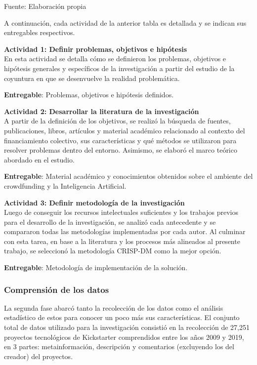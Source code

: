 \begin{flushleft}	%
	\small Fuente: Elaboración propia
\end{flushleft}

A continuación, cada actividad de la anterior tabla es detallada y se indican sus entregables respectivos.

\newpage
\textbf{Actividad 1: Definir problemas, objetivos e hipótesis}
\\
En esta actividad se detalla cómo se definieron los problemas, objetivos e hipótesis generales y específicos de la investigación a partir del estudio de la coyuntura en que se desenvuelve la realidad problemática.

\textbf{Entregable}: Problemas, objetivos e hipótesis definidos.


\textbf{Actividad 2: Desarrollar la literatura de la investigación}
\\
A partir de la definición de los objetivos, se realizó la búsqueda de fuentes, publicaciones, libros, artículos y material académico relacionado al contexto del financiamiento colectivo, sus características y qué métodos se utilizaron para resolver problemas dentro del entorno. Asimismo, se elaboró el marco teórico abordado en el estudio.

\textbf{Entregable}: Material académico y conocimientos obtenidos sobre el ambiente del crowdfunding y la Inteligencia Artificial.


\textbf{Actividad 3: Definir metodología de la investigación}
\\
Luego de conseguir los recursos intelectuales suficientes y los trabajos previos para el desarrollo de la investigación, se analizó cada antecedente y se compararon todas las metodologías implementadas por cada autor. Al culminar con esta tarea, en base a la literatura y los procesos más alineados al presente trabajo, se seleccionó la metodología CRISP-DM como la mejor opción.

\textbf{Entregable}: Metodología de implementación de la solución.


\subsubsection{Comprensión de los datos}
La segunda fase abarcó tanto la recolección de los datos como el análisis estadístico de estos para conocer un poco más sus características. El conjunto total de datos utilizado para la investigación consistió en la recolección de 27,251 proyectos tecnológicos de Kickstarter comprendidos entre los años 2009 y 2019, en 3 partes: metainformación, descripción y comentarios (excluyendo los del creador) del proyectos.

